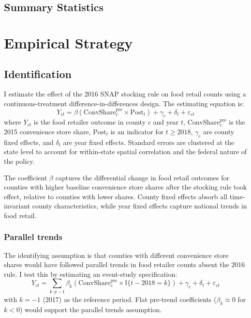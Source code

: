 \documentclass[12pt]{article}
\newcommand{\ind}{\mathbb{I}}
\begin{document}
\subsection{Summary Statistics}




\section{Empirical Strategy}
\label{sec:strategy}

\subsection{Identification}

I estimate the effect of the 2016 SNAP stocking rule on food retail counts using a continuous-treatment difference-in-differences design. The estimating equation is:
\begin{equation}
Y_{ct} = \beta \left( \text{ConvShare}_{c}^{\text{pre}} \times \text{Post}_t \right) + \gamma_c + \delta_t + \varepsilon_{ct}
\label{eq:main}
\end{equation}
where $Y_{ct}$ is the food retailer outcome in county $c$ and year $t$, $\text{ConvShare}_{c}^{\text{pre}}$ is the 2015 convenience store share, $\text{Post}_t$ is an indicator for $t \geq 2018$, $\gamma_c$ are county fixed effects, and $\delta_t$ are year fixed effects. Standard errors are clustered at the state level to account for within-state spatial correlation and the federal nature of the policy.

The coefficient $\beta$ captures the differential change in food retail outcomes for counties with higher baseline convenience store shares after the stocking rule took effect, relative to counties with lower shares. County fixed effects absorb all time-invariant county characteristics, while year fixed effects capture national trends in food retail.

\subsubsection*{Parallel trends} The identifying assumption is that counties with different convenience store shares would have followed parallel trends in food retailer counts absent the 2016 rule. I test this by estimating an event-study specification:
\begin{equation}
Y_{ct} = \sum_{k \neq -1} \beta_k \left( \text{ConvShare}_{c}^{\text{pre}} \times \ind\{t - 2018 = k\} \right) + \gamma_c + \delta_t + \varepsilon_{ct}
\label{eq:event}
\end{equation}
with $k = -1$ (2017) as the reference period. Flat pre-trend coefficients ($\beta_k \approx 0$ for $k < 0$) would support the parallel trends assumption.
\end{document}
